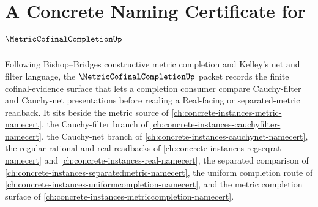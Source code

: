 \chapter{A Concrete Naming Certificate for $\MetricCofinalCompletionUp$}
\label{ch:concrete-instances-metric-cofinal-completion-namecert}

Following Bishop--Bridges constructive metric completion and Kelley's net and filter language, the $\MetricCofinalCompletionUp$ packet records the finite cofinal-evidence surface that lets a completion consumer compare Cauchy-filter and Cauchy-net presentations before reading a Real-facing or separated-metric readback. It sits beside the metric source of \autoref{ch:concrete-instances-metric-namecert}, the Cauchy-filter branch of \autoref{ch:concrete-instances-cauchyfilter-namecert}, the Cauchy-net branch of \autoref{ch:concrete-instances-cauchynet-namecert}, the regular rational and real readbacks of \autoref{ch:concrete-instances-regseqrat-namecert} and \autoref{ch:concrete-instances-real-namecert}, the separated comparison of \autoref{ch:concrete-instances-separatedmetric-namecert}, the uniform completion route of \autoref{ch:concrete-instances-uniformcompletion-namecert}, and the metric completion surface of \autoref{ch:concrete-instances-metriccompletion-namecert}.

